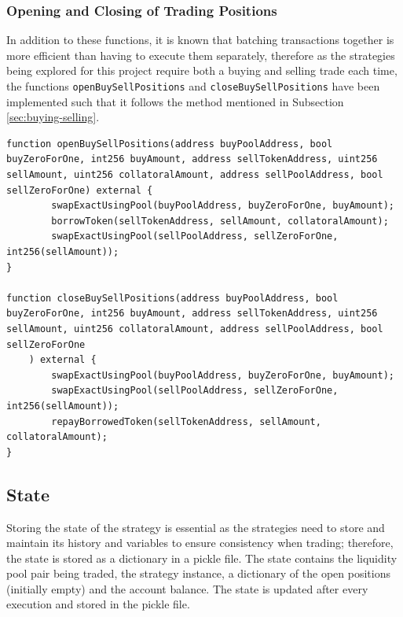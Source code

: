 \subsubsection{Opening and Closing of Trading Positions}
In addition to these functions, it is known that batching transactions together is more efficient than having to execute them separately, therefore as the strategies being explored for this project require both a buying and selling trade each time, the functions \texttt{openBuySellPositions} and \texttt{closeBuySellPositions} have been implemented such that it follows the method mentioned in Subsection \ref{sec:buying-selling}.

\begin{lstlisting}[language=Solidity]
function openBuySellPositions(address buyPoolAddress, bool buyZeroForOne, int256 buyAmount, address sellTokenAddress, uint256 sellAmount, uint256 collatoralAmount, address sellPoolAddress, bool sellZeroForOne) external {
        swapExactUsingPool(buyPoolAddress, buyZeroForOne, buyAmount);
        borrowToken(sellTokenAddress, sellAmount, collatoralAmount);
        swapExactUsingPool(sellPoolAddress, sellZeroForOne, int256(sellAmount));
}

function closeBuySellPositions(address buyPoolAddress, bool buyZeroForOne, int256 buyAmount, address sellTokenAddress, uint256 sellAmount, uint256 collatoralAmount, address sellPoolAddress, bool sellZeroForOne
    ) external {
        swapExactUsingPool(buyPoolAddress, buyZeroForOne, buyAmount);
        swapExactUsingPool(sellPoolAddress, sellZeroForOne, int256(sellAmount));
        repayBorrowedToken(sellTokenAddress, sellAmount, collatoralAmount);
}
\end{lstlisting}

\subsection{State}
Storing the state of the strategy is essential as the strategies need to store and maintain its history and variables to ensure consistency when trading; therefore, the state is stored as a dictionary in a pickle file. The state contains the liquidity pool pair being traded, the strategy instance, a dictionary of the open positions (initially empty) and the account balance. The state is updated after every execution and stored in the pickle file.

